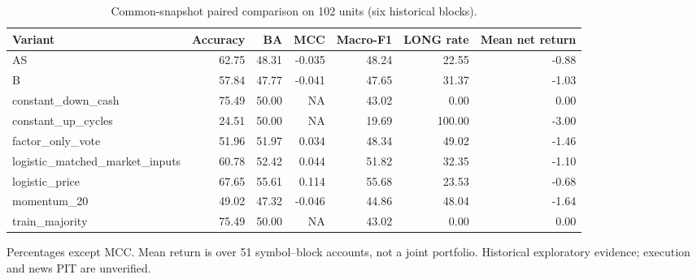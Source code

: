 \begin{table}[htbp]
\centering
\caption{Common-snapshot paired comparison on 102 units (six historical blocks).}
\label{tab:revision-paired-baselines}
\begin{tabular}{lrrrrrr}
\hline
Variant & Accuracy & BA & MCC & Macro-F1 & LONG rate & Mean net return \\
\hline
AS & 62.75 & 48.31 & -0.035 & 48.24 & 22.55 & -0.88 \\
B & 57.84 & 47.77 & -0.041 & 47.65 & 31.37 & -1.03 \\
constant\_down\_cash & 75.49 & 50.00 & NA & 43.02 & 0.00 & 0.00 \\
constant\_up\_cycles & 24.51 & 50.00 & NA & 19.69 & 100.00 & -3.00 \\
factor\_only\_vote & 51.96 & 51.97 & 0.034 & 48.34 & 49.02 & -1.46 \\
logistic\_matched\_market\_inputs & 60.78 & 52.42 & 0.044 & 51.82 & 32.35 & -1.10 \\
logistic\_price & 67.65 & 55.61 & 0.114 & 55.68 & 23.53 & -0.68 \\
momentum\_20 & 49.02 & 47.32 & -0.046 & 44.86 & 48.04 & -1.64 \\
train\_majority & 75.49 & 50.00 & NA & 43.02 & 0.00 & 0.00 \\
\hline
\end{tabular}
\par\footnotesize Percentages except MCC. Mean return is over 51 symbol--block accounts, not a joint portfolio. Historical exploratory evidence; execution and news PIT are unverified.
\end{table}
